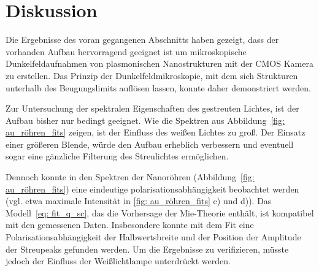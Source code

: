 \section{Diskussion}
Die Ergebnisse des voran gegangenen Abschnitts haben gezeigt, dass der vorhanden Aufbau hervorragend geeignet ist
um mikroskopische Dunkelfeldaufnahmen von plasmonischen Nanostrukturen mit der CMOS Kamera zu erstellen. Das Prinzip
der Dunkelfeldmikroskopie, mit dem sich Strukturen unterhalb des Beugungslimits auflösen lassen, konnte daher
demonstriert werden.

Zur Untersuchung der spektralen Eigenschaften des gestreuten Lichtes, ist der Aufbau bisher nur bedingt geeignet.
Wie die Spektren aus Abbildung~\ref{fig: au_röhren_fits} zeigen, ist der Einfluss des weißen Lichtes zu groß. Der Einsatz einer
größeren Blende, würde den Aufbau erheblich verbessern und eventuell sogar eine gänzliche Filterung des Streulichtes
ermöglichen.

Dennoch konnte in den Spektren der Nanoröhren (Abbildung~\ref{fig: au_röhren_fits}) eine eindeutige
polarisationsabhängigkeit beobachtet werden (vgl. etwa maximale Intensität in \ref{fig: au_röhren_fits} c) und d)).
Das Modell~\eqref{eq: fit_q_sc}, das die Vorhersage der Mie-Theorie enthält, ist kompatibel mit den
gemessenen Daten. Insbesondere konnte mit dem Fit eine Polarisationsabhängigkeit der Halbwertsbreite und der Position der
Amplitude der Streupeaks gefunden werden. Um die Ergebnisse zu verifizieren, müsste
jedoch der Einfluss der Weißlichtlampe unterdrückt werden.
